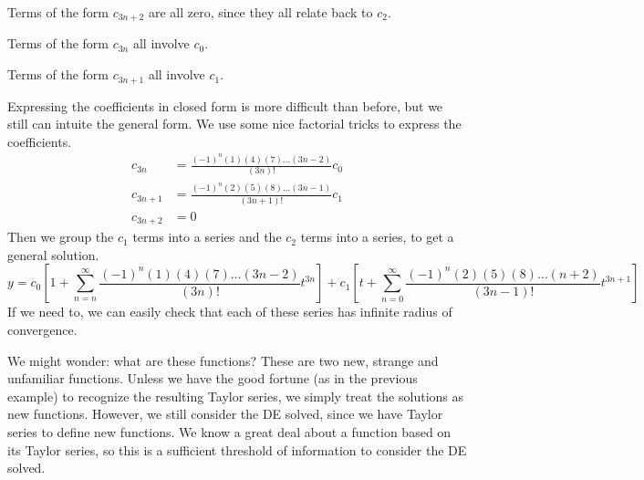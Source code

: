 \documentclass[fleqn,letterpaper]{report}
\begin{document}
\begin{example}
\begin{smallitemize}
\item Terms of the form $c_{3n+2}$ are all zero, since they
all relate back to $c_2$. 
\item Terms of the form $c_{3n}$ all involve $c_0$.
\item Terms of the form $c_{3n+1}$ all involve $c_1$.
\end{smallitemize}

Expressing the coefficients in closed form is more difficult
than before, but we still can intuite the general form. 
We use some nice factorial tricks to express the coefficients.
\begin{align*}
c_{3n} & = \frac{(-1)^n (1)(4)(7)\ldots(3n-2)}{(3n)!} c_0 \\
c_{3n+1} & = \frac{(-1)^n (2)(5)(8)\ldots(3n-1)}{(3n+1)!} c_1 \\
c_{3n+2} & = 0 
\end{align*}
Then we group the $c_1$ terms into a series and the $c_2$ terms
into a series, to get a general solution.
\begin{equation*}
y = c_0 \left[  1 + \sum_{n=n}^\infty \frac{(-1)^n
(1)(4)(7)\ldots(3n-2)}{(3n)!} t^{3n} \right] + 
c_1 \left[ t + \sum_{n=0}^\infty \frac{(-1)^n
(2)(5)(8)\ldots(n+2)}{(3n-1)!} t^{3n+1} \right]
\end{equation*}
If we need to, we can easily check that each of these series
has infinite radius of convergence. 

We might wonder: what are these functions? These are two new,
strange and unfamiliar functions. Unless we have the good
fortune (as in the previous example) to recognize the
resulting Taylor series, we simply treat the solutions as new
functions.  However, we still consider the DE solved, since we
have Taylor series to define new functions. We know a
great deal about a function based on its Taylor series, so
this is a sufficient threshold of information to consider the
DE solved.
\end{example}
\end{document}
